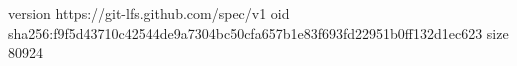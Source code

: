 version https://git-lfs.github.com/spec/v1
oid sha256:f9f5d43710c42544de9a7304bc50cfa657b1e83f693fd22951b0ff132d1ec623
size 80924
